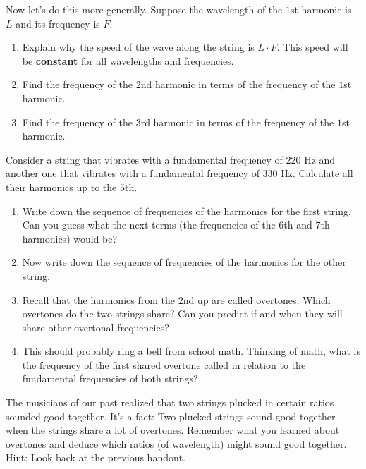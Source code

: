 \documentclass[12pt,noauthor,nooutcomes,]{ximera}
\begin{document}
\begin{question}
Now let's do this more generally. Suppose the wavelength of the $1$st harmonic is $L$ and its frequency is $F$.
\begin{enumerate}
\item Explain why the speed of the wave along the string is $L\cdot F$. This speed will be \textbf{constant} for all wavelengths and frequencies.
\item Find the frequency of the $2$nd harmonic in terms of the frequency of the $1$st harmonic. 
\item Find the frequency of the $3$rd harmonic in terms of the frequency of the $1$st harmonic. 
\end{enumerate}

\end{question}

\begin{question}
Consider a string that vibrates with a fundamental frequency of 220 Hz and another one that vibrates with a fundamental frequency of 330 Hz. Calculate all their harmonics up to the $5$th.
\begin{enumerate}
    \item Write down the sequence of frequencies of the harmonics for the first string. Can you guess what the next terms (the frequencies of the 6th and 7th harmonics) would be?
    \item Now write down the sequence of frequencies of the harmonics for the other string. 
    \item Recall that the harmonics from the $2$nd up are called overtones. Which overtones do the two strings share? Can you predict if and when they will share other overtonal frequencies?
    \item This should probably ring a bell from school math. Thinking of math, what is the frequency of the first shared overtone called in relation to the fundamental frequencies of both strings?
\end{enumerate}

\end{question}

\begin{question} The musicians of our past realized that two strings plucked in certain ratios sounded good together. It's a fact: Two plucked strings sound good together when the strings share a lot of overtones.  Remember what you learned about overtones and deduce which ratios (of wavelength) might sound good together. Hint: Look back at the previous handout.
\end{question}
\end{document}
